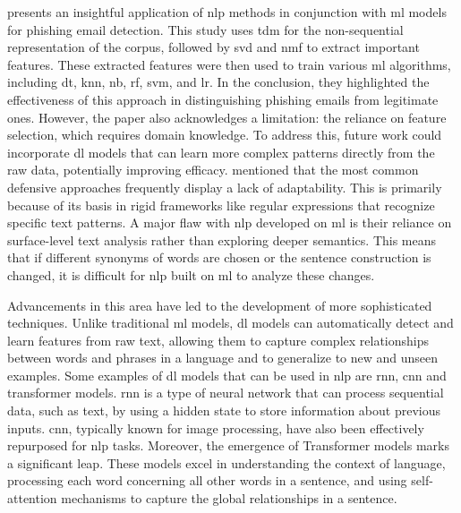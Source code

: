 \citet{Vazhayil201869} presents an insightful application of \ac{nlp} methods in conjunction with \ac{ml} models for phishing email detection. This study uses \ac{tdm} for the non-sequential representation of the corpus, followed by \ac{svd} and \ac{nmf} to extract important features. These extracted features were then used to train various \ac{ml} algorithms, including \ac{dt}, \ac{knn}, \ac{nb}, \ac{rf}, \ac{svm}, and \ac{lr}. In the conclusion, they highlighted the effectiveness of this approach in distinguishing phishing emails from legitimate ones. However, the paper also acknowledges a limitation: the reliance on feature selection, which requires domain knowledge. To address this, future work could incorporate \ac{dl} models that can learn more complex patterns directly from the raw data, potentially improving efficacy. \citet{Gutierrez2018988} mentioned that the most common defensive approaches frequently display a lack of adaptability. This is primarily because of its basis in rigid frameworks like regular expressions that recognize specific text patterns. A major flaw with \ac{nlp} developed on \ac{ml} is their reliance on surface-level text analysis rather than exploring deeper semantics. This means that if different synonyms of words are chosen or the sentence construction is changed, it is difficult for \ac{nlp} built on \ac{ml} to analyze these changes.

Advancements in this area have led to the development of more sophisticated techniques. Unlike traditional \ac{ml} models, \ac{dl} models can automatically detect and learn features from raw text, allowing them to capture complex relationships between words and phrases in a language and to generalize to new and unseen examples. Some examples of \ac{dl} models that can be used in \ac{nlp} are \ac{rnn}, \ac{cnn} and transformer models. \ac{rnn} is a type of neural network that can process sequential data, such as text, by using a hidden state to store information about previous inputs. \ac{cnn}, typically known for image processing, have also been effectively repurposed for \ac{nlp} tasks. Moreover, the emergence of Transformer models marks a significant leap. These models excel in understanding the context of language, processing each word concerning all other words in a sentence, and using self-attention mechanisms to capture the global relationships in a sentence.

